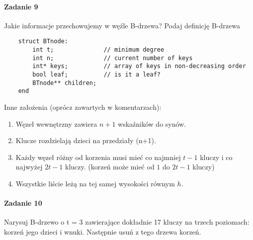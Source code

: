 \documentclass[18pt]{extarticle}
\begin{document}
\paragraph{Zadanie 9} Jakie informacje przechowujemy w węźle B-drzewa? Podaj definicję B-drzewa

\begin{lstlisting}
    struct BTnode:
        int t;              // minimum degree
        int n;              // current number of keys
        int* keys;          // array of keys in non-decreasing order
        bool leaf;          // is it a leaf?
        BTnode** children;
    end
\end{lstlisting}
Inne założenia (oprócz zawartych w komentarzach):
\begin{enumerate}
    \item Węzeł wewnętrzny zawiera $n+1$ wskaźników do synów.
    \item Klucze rozdzielają dzieci na przedziały (n+1).
    \item Każdy węzeł różny od korzenia musi mieć co najmniej $t-1$ kluczy i co najwyżej $2t-1$ kluczy. (korzeń może mieć od $1$ do $2t-1$ kluczy)
    \item Wszystkie liście leżą na tej samej wysokości równym $h$.
\end{enumerate}

\paragraph{Zadanie 10} Narysuj B-drzewo o t = 3 zawierające dokładnie 17 kluczy na trzech poziomach: korzeń jego dzieci i wnuki. Następnie usuń z tego drzewa korzeń.
\end{document}
